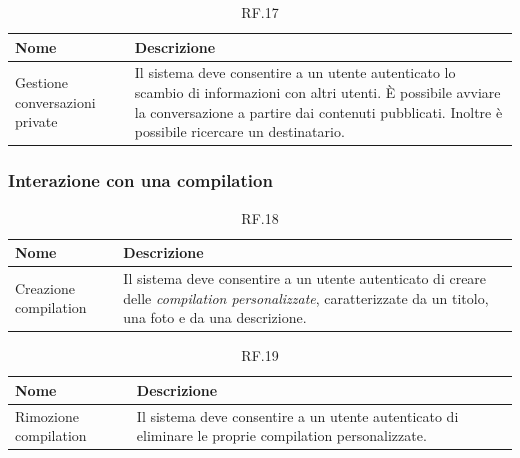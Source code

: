 \documentclass{natourDoc}
\begin{document}
\begin{table}[H]
	\centering
	\begin{tabular}{ |p{5cm}|p{10.3cm}| }
		\hline
		\rowcolor{PineGreen!70}
		\textbf{Nome}                  & \textbf{Descrizione}                                                                            \\
		\hline
		Gestione conversazioni private & Il sistema deve consentire a un utente autenticato lo scambio di informazioni con altri utenti.
		È possibile avviare la conversazione a partire dai contenuti pubblicati. Inoltre è possibile ricercare un destinatario.          \\
		\hline
	\end{tabular}
	\caption{RF.17}

\end{table}

\subsubsection{Interazione con una compilation}
\begin{table}[H]
	\centering
	\begin{tabular}{ |p{5cm}|p{10.3cm}| }
		\hline
		\rowcolor{PineGreen!70}
		\textbf{Nome}         & \textbf{Descrizione}                                                                                    \\
		\hline
		Creazione compilation & Il sistema deve consentire a un utente autenticato di creare delle \textit{compilation personalizzate},
		caratterizzate da un titolo, una foto e da una descrizione.                                                                     \\
		\hline
	\end{tabular}
	\caption{RF.18}

\end{table}

\begin{table}[H]
	\centering
	\begin{tabular}{ |p{5cm}|p{10.3cm}| }
		\hline
		\rowcolor{PineGreen!70}
		\textbf{Nome}         & \textbf{Descrizione}                                                       \\
		\hline
		Rimozione compilation & Il sistema deve consentire a un utente autenticato di eliminare le proprie
		compilation personalizzate.                                                                        \\
		\hline
	\end{tabular}
	\caption{RF.19}

\end{table}
\end{document}
